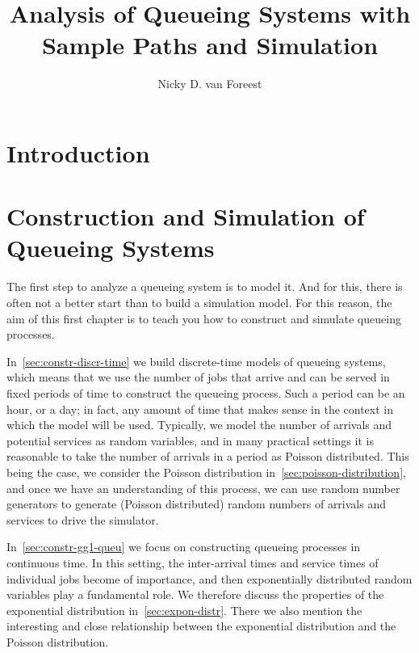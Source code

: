 \usepackage{preamble}

\title{Analysis of Queueing Systems with  Sample Paths and Simulation}
\author{Nicky D. van  Foreest}


\frontmatter
\maketitle

\setcounter{tocdepth}{1}
\tableofcontents





\mainmatter

\chapter{Introduction}
\label{cha:introduction}




\chapter{Construction and Simulation of Queueing Systems}
\label{cha:single-stat-queu}


The first step to analyze a queueing system is to model it.
And for this, there is often not a better start than to build a simulation model.
For this reason, the aim of  this first chapter is to teach you how to construct and simulate queueing processes.

In~\cref{sec:constr-discr-time} we build discrete-time models of queueing systems, which means that we use the number of jobs that arrive and can be served in fixed periods of time to construct the queueing process.
Such a period can be an hour, or a day; in fact, any amount of time that makes sense in the context in which the model will be used.
Typically, we model the number of arrivals and potential services as random variables, and in many practical settings it is reasonable to take the number of arrivals in a period as Poisson distributed.
This being the case, we consider the Poisson distribution in~\cref{sec:poisson-distribution}, and once we have an understanding of this process, we can use random number generators to generate (Poisson distributed) random numbers of arrivals and services to drive the simulator.


In~\cref{sec:constr-gg1-queu} we focus on constructing queueing processes in continuous time.
In this setting, the inter-arrival times and service times of individual jobs become of importance, and then exponentially distributed random variables play a fundamental role.
We therefore discuss the properties of the exponential distribution in~\cref{sec:expon-distr}.
There we also mention the interesting and close relationship between the exponential distribution and the Poisson distribution.

